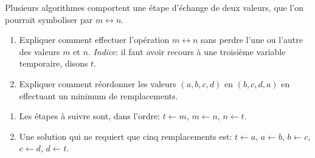 \begin{exercice}
  Plusieurs algorithmes comportent une étape d'échange de deux
  valeurs, que l'on pourrait symboliser par $m \leftrightarrow n$.
  \begin{enumerate}
  \item Expliquer comment effectuer l'opération $m \leftrightarrow n$
    sans perdre l'une ou l'autre des valeurs $m$ et $n$.
    \emph{Indice}: il faut avoir recours à une troisième variable
    temporaire, disons $t$.
  \item Expliquer comment réordonner les valeurs $(a, b, c, d)$ en
    $(b, c, d, a)$ en effectuant un minimum de remplacements.
  \end{enumerate}
  \begin{sol}
    \begin{enumerate}
    \item Les étapes à suivre sont, dans l'ordre: $t \leftarrow m$, $m
      \leftarrow n$, $n \leftarrow t$.
    \item Une solution qui ne requiert que cinq remplacements est:
      $t \leftarrow a$, $a \leftarrow b$, $b \leftarrow c$,
      $c \leftarrow d$, $d \leftarrow t$.
    \end{enumerate}
  \end{sol}
\end{exercice}

